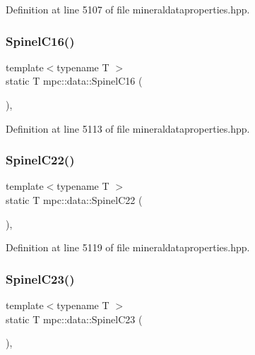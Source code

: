 Definition at line 5107 of file mineraldataproperties.\+hpp.

\mbox{\label{namespacempc_1_1data_adc3e58f1b889c8210df5ba20e3e2788c}} 
\subsubsection{\texorpdfstring{Spinel\+C16()}{SpinelC16()}}
{\footnotesize\ttfamily template$<$typename T $>$ \\
static T mpc\+::data\+::\+Spinel\+C16 (\begin{DoxyParamCaption}{ }\end{DoxyParamCaption})\hspace{0.3cm}{\ttfamily [inline]}, {\ttfamily [static]}}



Definition at line 5113 of file mineraldataproperties.\+hpp.

\mbox{\label{namespacempc_1_1data_a90a328adecd1aeec8dbba1cd7706067f}} 
\subsubsection{\texorpdfstring{Spinel\+C22()}{SpinelC22()}}
{\footnotesize\ttfamily template$<$typename T $>$ \\
static T mpc\+::data\+::\+Spinel\+C22 (\begin{DoxyParamCaption}{ }\end{DoxyParamCaption})\hspace{0.3cm}{\ttfamily [inline]}, {\ttfamily [static]}}



Definition at line 5119 of file mineraldataproperties.\+hpp.

\mbox{\label{namespacempc_1_1data_a169d37bd87f004a14785f3e54f16a905}} 
\subsubsection{\texorpdfstring{Spinel\+C23()}{SpinelC23()}}
{\footnotesize\ttfamily template$<$typename T $>$ \\
static T mpc\+::data\+::\+Spinel\+C23 (\begin{DoxyParamCaption}{ }\end{DoxyParamCaption})\hspace{0.3cm}{\ttfamily [inline]}, {\ttfamily [static]}}



